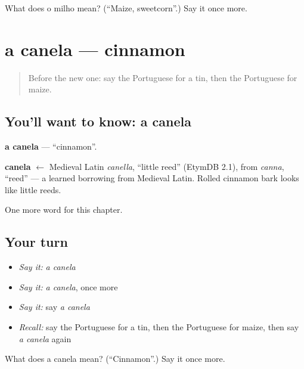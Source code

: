 \begin{tcolorbox}[breakable,colback=teal!4,colframe=teal!35!black,title={Before you move on}]
What does o milho mean? (\textquotedblleft{}Maize, sweetcorn\textquotedblright{}.) Say it once more.
\end{tcolorbox}
\section[a canela]{a canela — cinnamon}

\label{lesson:PT-C199-canela}



\begin{quote}
Before the new one: say the Portuguese for a tin, then the Portuguese for maize.
\end{quote}

\subsection*{You'll want to know: a canela}
\textbf{a canela} — \textquotedblleft{}cinnamon\textquotedblright{}.

\begin{cousinweb}
\textbf{canela} $\leftarrow$ Medieval Latin \emph{canella}, \textquotedblleft{}little reed\textquotedblright{} (EtymDB 2.1), from \emph{canna}, \textquotedblleft{}reed\textquotedblright{} — a learned borrowing from Medieval Latin. Rolled cinnamon bark looks like little reeds.
\end{cousinweb}

\begin{grammarlens}[title={What you've built}]
One more word for this chapter.
\end{grammarlens}

\subsection*{Your turn}
\begin{itemize}
\raggedright
  \item \emph{Say it:} \emph{a canela}
  \item \emph{Say it:} \emph{a canela}, once more
  \item \emph{Say it:} say \emph{a canela}
  \item \emph{Recall:} say the Portuguese for a tin, then the Portuguese for maize, then say \emph{a canela} again
\end{itemize}

\begin{tcolorbox}[breakable,colback=teal!4,colframe=teal!35!black,title={Before you move on}]
What does a canela mean? (\textquotedblleft{}Cinnamon\textquotedblright{}.) Say it once more.
\end{tcolorbox}
